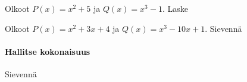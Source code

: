 \begin{tehtavasivu}
\begin{tehtava}
    Olkoot $P(x)=x^2+5$ ja $Q(x)=x^3-1$. Laske
    \begin{alakohdat}
    \end{alakohdat}
    \begin{vastaus}
        \begin{alakohdat}
        \end{alakohdat}
    \end{vastaus}
\end{tehtava}

\begin{tehtava}
    Olkoot $P(x)=x^2+3x+4$ ja $Q(x)=x^3-10x+1$. Sievennä
    \begin{alakohdat}
    \end{alakohdat}
    \begin{vastaus}
        \begin{alakohdat}
        \end{alakohdat}
    \end{vastaus}
\end{tehtava}



\paragraph*{Hallitse kokonaisuus}

\begin{tehtava}
    Sievennä
    \begin{alakohdat}
    \end{alakohdat}
    \begin{vastaus}
        \begin{alakohdat}
        \end{alakohdat}
    \end{vastaus}
\end{tehtava}


\end{tehtavasivu}
